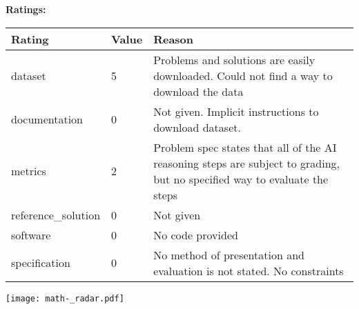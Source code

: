 {{{\bf Ratings:} ~ \\

\begin{tabular}{p{} p{} p{}}
\hline
Rating & Value & Reason \\
\hline
dataset & 5 & Problems and solutions are easily downloaded. Could not find a way to download the data
 \\
documentation & 0 & Not given. Implicit instructions to download dataset.
 \\
metrics & 2 & Problem spec states that all of the AI reasoning steps are subject to grading, but no specified way to evaluate the steps
 \\
reference\_solution & 0 & Not given
 \\
software & 0 & No code provided
 \\
specification & 0 & No method of presentation and evaluation is not stated. No constraints
 \\
\hline
\end{tabular}

\texttt{[image: math-\_radar.pdf]}
}}
\clearpage
